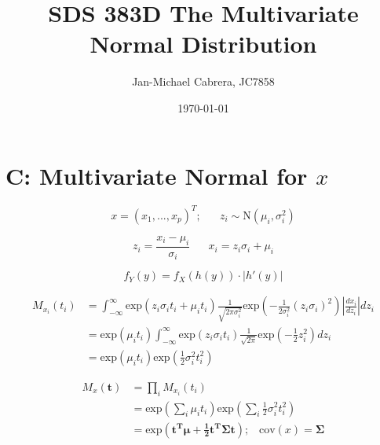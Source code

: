 \documentclass[12pt]{article}
\begin{document}
    \title{SDS 383D The Multivariate Normal Distribution}
    \author{Jan-Michael Cabrera, JC7858}
    \date{\today}
    \maketitle

    \section*{C: Multivariate Normal for $x$}

        \begin{equation}
            x = (x_1,...,x_p)^T; \hspace{20pt} z_i \sim \text{N}(\mu_i,\sigma_i^2)
        \end{equation}

        \begin{equation}
            z_i = \frac{x_i-\mu_i}{\sigma_i} \hspace{20pt} x_i = z_i \sigma_i + \mu_i 
        \end{equation}

        \begin{equation}
            f_Y(y) = f_X(h(y)) \cdot |h'(y)|
        \end{equation}

        \begin{align}
            M_{x_i}(t_i) &= \int_{-\infty}^\infty \text{exp}(z_i \sigma_i t_i +\mu_i t_i) \frac{1}{\sqrt{2 \pi \sigma_i^2}} \text{exp}\left( -\frac{1}{2 \sigma_i^2} (z_i \sigma_i)^2 \right) \left | \frac{dx_i}{dz_i} \right | dz_i \\
            &= \text{exp}(\mu_i t_i) \int_{-\infty}^{\infty} \text{exp}(z_i \sigma_i t_i) \frac{1}{\sqrt{2 \pi}} \text{exp} \left ( - \frac{1}{2} z_i^2\right) dz_i \\
            & = \text{exp}(\mu_i t_i) \text{exp}\left ( \frac{1}{2} \sigma_i^2 t_i^2 \right)
        \end{align}

        \begin{align}
            M_x(\mathbf{t}) &= \prod_i M_{x_i}(t_i) \\
            & = \text{exp} \left (\sum_i \mu_i t_i \right ) \text{exp}\left( \sum_i \frac{1}{2} \sigma_i^2 t_i^2 \right)\\
            & = \text{exp}(\mathbf{t^T \mu + \frac{1}{2} t^T \Sigma t}); \hspace{10pt} \text{cov}(x) = \mathbf{\Sigma}
        \end{align}
\end{document}
